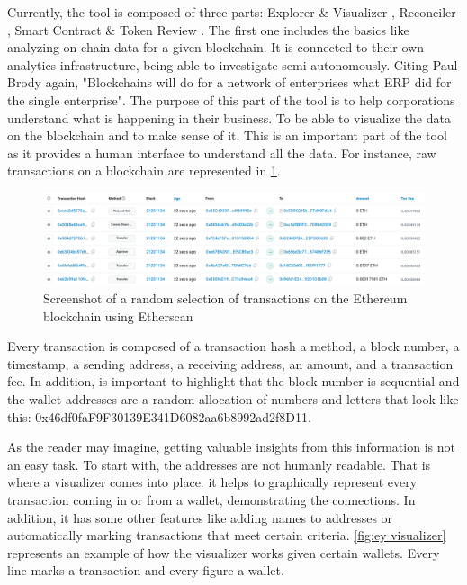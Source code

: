 Currently, the tool is composed of three parts: Explorer \& Visualizer \cite{ey_explorer_visualizer}, Reconciler \cite{ey_reconciler}, Smart Contract \& Token Review \cite{ey_smart_contract_review}. The first one includes the basics like analyzing on-chain data for a given blockchain. It is connected to their own analytics infrastructure, being able to investigate semi-autonomously. Citing Paul Brody \cite{ey_blockchain_explorer} again, "Blockchains will do for a network of enterprises what ERP did for the single enterprise". The purpose of this part of the tool is to help corporations understand what is happening in their business. To be able to visualize the data on the blockchain and to make sense of it. This is an important part of the tool as it provides a human interface to understand all the data. For instance, raw transactions on a blockchain are represented in \cref{fig:etherscan}.

\begin{figure}[h!]
    \centering
    \includegraphics[width=1\linewidth]{include/Ethereum transaction.png}
    \caption{Screenshot of a random selection of transactions on the Ethereum blockchain using Etherscan \cite{etherscan}}
    \label{fig:etherscan}
\end{figure}

Every transaction is composed of a transaction hash a method, a block number, a timestamp, a sending address, a receiving address, an amount, and a transaction fee. In addition, is important to highlight that the block number is sequential and the wallet addresses are a random allocation of numbers and letters that look like this: 0x46df0faF9F30139E341D6082aa6b8992ad2f8D11.

As the reader may imagine, getting valuable insights from this information is not an easy task. To start with, the addresses are not humanly readable. That is where a visualizer comes into place. it helps to graphically represent every transaction coming in or from a wallet, demonstrating the connections. In addition, it has some other features like adding names to addresses or automatically marking transactions that meet certain criteria. \cref{fig:ey visualizer} represents an example of how the visualizer works given certain wallets. Every line marks a transaction and every figure a wallet. 



